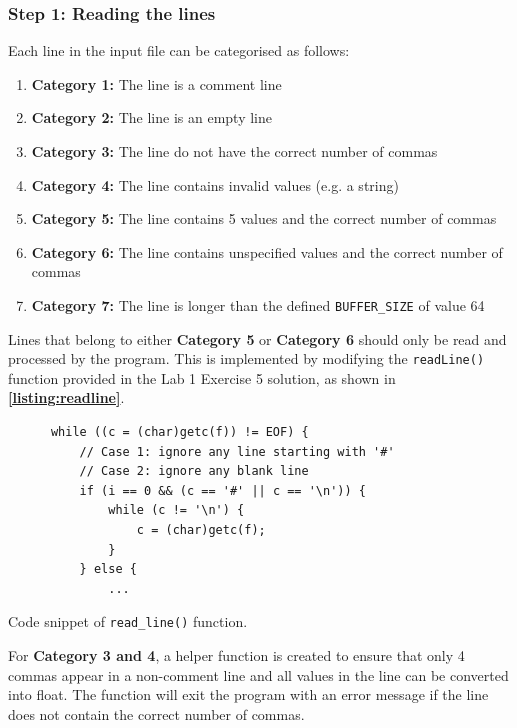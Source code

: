 \documentclass[12pt, a4paper]{article}
\let\oldcref\cref
\renewcommand{\cref}[1]{\textbf{\oldcref{#1}}}
\begin{document}
\subsubsection*{Step 1: Reading the lines}
Each line in the input file can be categorised as follows:
\begin{enumerate}
  \item \textbf{Category 1:} The line is a comment line
  \item \textbf{Category 2:} The line is an empty line
  \item \textbf{Category 3:} The line do not have the correct number of commas
  \item \textbf{Category 4:} The line contains invalid values (e.g. a string)
  \item \textbf{Category 5:} The line contains 5 values and the correct number of commas
  \item \textbf{Category 6:} The line contains unspecified values and the correct number of commas
  \item \textbf{Category 7:} The line is longer than the defined \texttt{BUFFER\_SIZE} of value 64
\end{enumerate}

Lines that belong to either \textbf{Category 5} or \textbf{Category 6} should only be read and
processed by the program. This is implemented by modifying the \texttt{readLine()} function
provided in the Lab 1 Exercise 5 solution, as shown in \cref{listing:readline}.

\begin{listing}[ht]
  \begin{verbatim}
      while ((c = (char)getc(f)) != EOF) {
          // Case 1: ignore any line starting with '#'
          // Case 2: ignore any blank line
          if (i == 0 && (c == '#' || c == '\n')) {
              while (c != '\n') {
                  c = (char)getc(f);
              }
          } else {
              ...
  \end{verbatim}
  \caption{Code snippet of \texttt{read_line()} function.} \label{listing:readline}
\end{listing}

For \textbf{Category 3 and 4}, a helper function is created to ensure that only 4 commas appear in a
non-comment line and all values in the line can be converted into float. The function will exit the
program with an error message if the line does not contain the correct number of commas.
\end{document}
